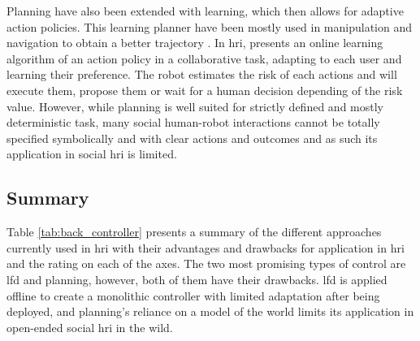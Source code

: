     
    Planning have also been extended with learning, which then allows for adaptive action policies. This learning planner have been mostly used in manipulation and navigation to obtain a better trajectory \citep{jain2013learning,beetz2004rpllearn}. In \gls{hri}, \cite{munzer2017efficient} presents an online learning algorithm of an action policy in a collaborative task, adapting to each user and learning their preference. The robot estimates the risk of each actions and will execute them, propose them or wait for a human decision depending of the risk value. However, while planning is well suited for strictly defined and mostly deterministic task, many social human-robot interactions cannot be totally specified symbolically and with clear actions and outcomes and as such its application in social \gls{hri} is limited.
	
	
	
\subsection{Summary}

	Table \ref{tab:back_controller} presents a summary of the different approaches currently used in \gls{hri} with their advantages and drawbacks for application in \gls{hri} and the rating on each of the axes. The two most promising types of control are \gls{lfd} and planning, however, both of them have their drawbacks. \gls{lfd} is applied offline to create a monolithic controller with limited adaptation after being deployed, and planning's reliance on a model of the world limits its application in open-ended social \gls{hri} in the wild.
	
